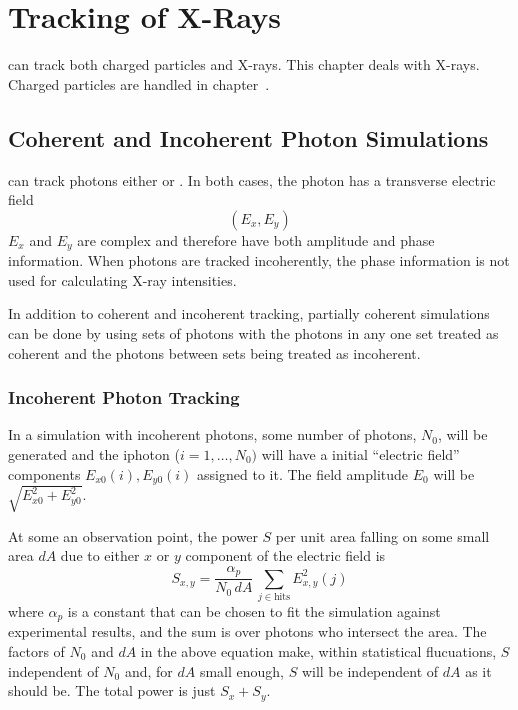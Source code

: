 \chapter{Tracking of X-Rays}
\label{c:xray.track}

\bmad can track both charged particles and X-rays. This chapter deals
with X-rays. Charged particles are handled in chapter~.

\section{Coherent and Incoherent Photon Simulations}
\label{s:coher.incoher}

\bmad can track photons either  or .
In both cases, the photon has a transverse electric field 
\begin{equation}
  (E_x, E_y)
\end{equation}
$E_x$ and $E_y$ are complex and therefore have both amplitude and phase information. When photons
are tracked incoherently, the phase information is not used for calculating X-ray intensities.

In addition to coherent and incoherent tracking, partially coherent simulations can be done by using
sets of photons with the photons in any one set treated as coherent and the photons between sets
being treated as incoherent.

\subsection{Incoherent Photon Tracking}
\label{s:incoher}

In a simulation with incoherent photons, some number of photons,
$N_0$, will be generated and the i\Th photon ($i = 1, \ldots, N_0)$
will have a initial ``electric field'' components $E_{x0}(i),
E_{y0}(i)$ assigned to it. The field amplitude $E_0$ will be
$\sqrt{E_{x0}^2 + E_{y0}^2}$.

At some an observation point, the power $S$ per unit area falling on
some small area $dA$ due to either $x$ or $y$ component of the
electric field is
\begin{equation}
  S_{x,y} = \frac{\alpha_p}{N_0 \, dA} \, \sum_{j \in \text{hits}} E_{x,y}^2(j)
  \label{panda1}
\end{equation}
where $\alpha_p$ is a constant that can be chosen to fit the
simulation against experimental results, and the sum is over photons
who intersect the area. The factors of $N_0$ and $dA$ in the above
equation make, within statistical flucuations, $S$ independent of
$N_0$ and, for $dA$ small enough, $S$ will be independent of $dA$ as
it should be. The total power is just $S_x + S_y$.

